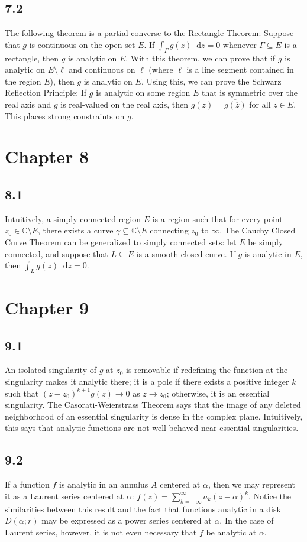 \documentclass[12pt]{article}
\newcommand{\cc}{{\mathbb C}}
\newcommand*\diff{\mathop{}\!\mathrm{d}}
\begin{document}
\subsection*{7.2}
The following theorem is a partial converse to the Rectangle Theorem: Suppose that $g$ is continuous on the open set $E$. If \(\int_\Gamma g(z) \diff z = 0\) whenever $\Gamma \subseteq E$ is a rectangle, then $g$ is analytic on $E$. With this theorem, we can prove that if $g$ is analytic on $E \setminus \ell$ and continuous on $\ell$ (where $\ell$ is a line segment contained in the region $E$), then $g$ is analytic on $E$. Using this, we can prove the Schwarz Reflection Principle: If $g$ is analytic on some region $E$ that is symmetric over the real axis and $g$ is real-valued on the real axis, then $g(z) = \overline{g(\overline{z})}$ for all $z \in E$. This places strong constraints on $g$.
\section*{Chapter 8}
\subsection*{8.1}
Intuitively, a simply connected region $E$ is a region such that for every point $z_0 \in \cc \setminus E$, there exists a curve $\gamma \subseteq \cc \setminus E$ connecting $z_0$ to $\infty$. The Cauchy Closed Curve Theorem can be generalized to simply connected sets: let $E$ be simply connected, and suppose that $L \subseteq E$ is a smooth closed curve. If $g$ is analytic in $E$, then \(\int_L g(z) \diff z  = 0\).
\section*{Chapter 9}
\subsection*{9.1}
An isolated singularity of $g$ at $z_0$ is removable if redefining the function at the singularity makes it analytic there; it is a pole if there exists a positive integer $k$ such that $(z-z_0)^{k+1} g(z) \rightarrow 0$ as $z \rightarrow z_0$; otherwise, it is an essential singularity. The Casorati-Weierstrass Theorem says that the image of any deleted neighborhood of an essential singularity is dense in the complex plane. Intuitively, this says that analytic functions are not well-behaved near essential singularities.
\subsection*{9.2}
If a function $f$ is analytic in an annulus $A$ centered at $\alpha$, then we may represent it as a Laurent series centered at $\alpha$: $f(z) = \sum_{k = -\infty}^\infty a_k(z-\alpha)^k$. Notice the similarities between this result and the fact that functions analytic in a disk $D(\alpha;r)$ may be expressed as a power series centered at $\alpha$. In the case of Laurent series, however, it is not even necessary that $f$ be analytic at $\alpha$.
\end{document}
